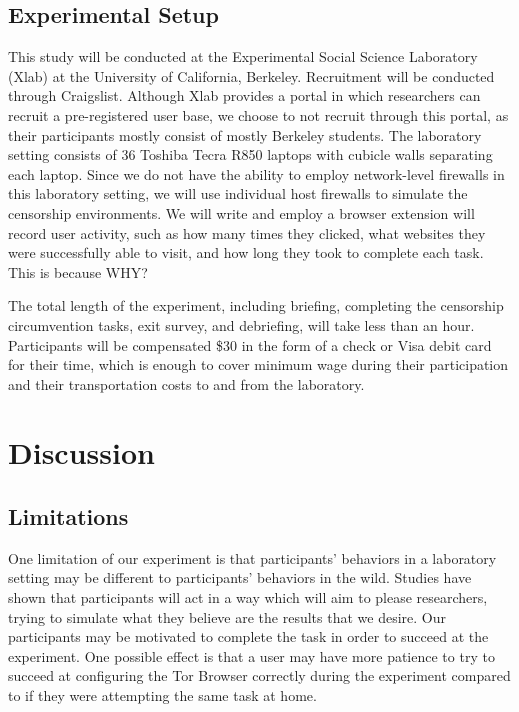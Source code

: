 \documentclass[letterpaper,twocolumn,11pt]{article}
\begin{document}
\subsection{Experimental Setup} 

\indent\indent This study will be conducted at the Experimental Social Science Laboratory (Xlab)
at the University of California, Berkeley. Recruitment will be conducted through Craigslist. 
Although Xlab provides a portal in which researchers can recruit a pre-registered user base,
we choose to not recruit through this portal, as their participants mostly consist of mostly Berkeley 
students. The laboratory setting consists of 36 Toshiba Tecra R850 laptops with cubicle walls 
separating each laptop. Since we do not have the ability to employ network-level firewalls in this
laboratory setting, we will use individual host firewalls to simulate the censorship environments.  
We will write and employ a browser extension will record user activity, such as how many times they 
clicked, what websites they were successfully able to visit, and how long they took to complete 
each task. {\color {red} This is because WHY?} %

The total length of the experiment, including briefing, completing the censorship circumvention tasks, 
exit survey, and debriefing, will take less than an hour. Participants will be compensated \$30 in the form
of a check or Visa debit card for their time, which is enough to cover minimum wage during their participation 
and their transportation costs to and from the laboratory. 

\section{Discussion} 

\subsection{Limitations}
\indent \indent One limitation of our experiment is that participants' behaviors in a laboratory setting may
be different to participants' behaviors in the wild. Studies have shown that participants will act in a way which 
will aim to please researchers, trying to simulate what they believe are the results that we desire. Our participants
may be motivated to complete the task in order to succeed at the experiment. One possible effect is that a user
may have more patience to try to succeed at configuring the Tor Browser correctly during the experiment 
compared to if they were attempting the same task at home. 
\end{document}
